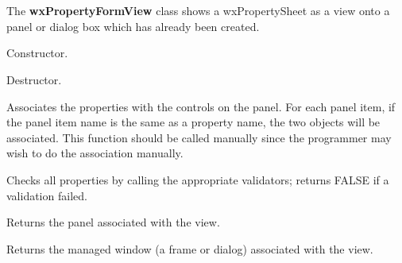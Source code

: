 \section{}\label{wxpropertyformview}

The {\bf wxPropertyFormView} class shows a wxPropertySheet as a view onto a panel or dialog
box which has already been created.






Constructor.



Destructor.

\label{wxpropertyformviewassociatenames}


Associates the properties with the controls on the panel. For each panel item, if the
panel item name is the same as a property name, the two objects will be associated.
This function should be called manually since the programmer may wish to do the
association manually.

\label{wxpropertyformviewcheck}


Checks all properties by calling the appropriate validators; returns FALSE if a validation failed.

\label{wxpropertyformviewgetpanel}


Returns the panel associated with the view.

\label{wxpropertyformviewgetmanagedwindow}


Returns the managed window (a frame or dialog) associated with the view.

